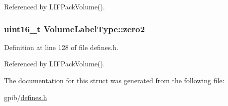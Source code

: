 Referenced by L\+I\+F\+Pack\+Volume().

\subsubsection[{\texorpdfstring{zero2}{zero2}}]{\setlength{\rightskip}{0pt plus 5cm}uint16\+\_\+t Volume\+Label\+Type\+::zero2}\hypertarget{structVolumeLabelType_a18c623a319ca760c0ad57ff96346e54f}{}\label{structVolumeLabelType_a18c623a319ca760c0ad57ff96346e54f}


Definition at line 128 of file defines.\+h.



Referenced by L\+I\+F\+Pack\+Volume().



The documentation for this struct was generated from the following file\+:\begin{DoxyCompactItemize}
\item 
gpib/\hyperlink{defines_8h}{defines.\+h}\end{DoxyCompactItemize}
